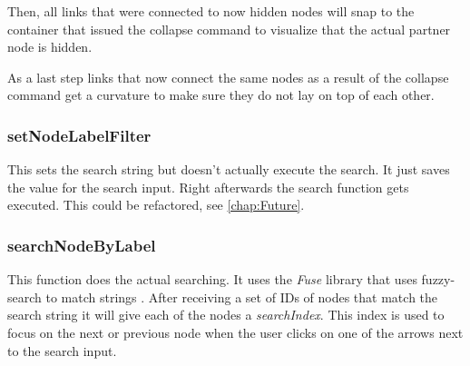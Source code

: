 Then, all links that were connected to now hidden nodes will snap to the container that issued the collapse command to visualize that the actual partner node is hidden.

As a last step links that now connect the same nodes as a result of the collapse command get a curvature to make sure they do not lay on top of each other.

\subsubsection{setNodeLabelFilter}
This sets the search string but doesn't actually execute the search. It just saves the value for the search input. Right afterwards the search function gets executed. This could be refactored, see \autoref{chap:Future}.

\subsubsection{searchNodeByLabel}
This function does the actual searching. It uses the \emph{Fuse} library that uses fuzzy-search to match strings \cite{Fuze}. After receiving a set of IDs of nodes that match the search string it will give each of the nodes a \emph{searchIndex}. This index is used to focus on the next or previous node when the user clicks on one of the arrows next to the search input.
